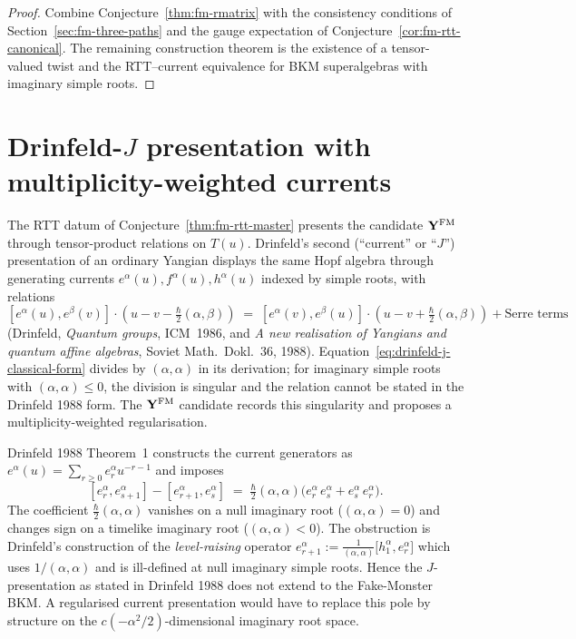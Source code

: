\begin{proof}
Combine Conjecture~\ref{thm:fm-rmatrix} with the consistency conditions
of Section~\ref{sec:fm-three-paths} and the gauge expectation of
Conjecture~\ref{cor:fm-rtt-canonical}. The remaining construction
theorem is the existence of a tensor-valued twist and the RTT--current
equivalence for BKM superalgebras with imaginary simple roots.
\end{proof}

\section{Drinfeld-\texorpdfstring{$J$}{J} presentation with multiplicity-weighted currents}
\label{sec:fm-drinfeld-j}

The RTT datum of Conjecture~\ref{thm:fm-rtt-master} presents the candidate $\mathbf{Y}^{\mathrm{FM}}$ through tensor-product relations on $T(u)$. Drinfeld's second (``current'' or ``$J$'') presentation of an ordinary Yangian displays the same Hopf algebra through generating currents $e^\alpha(u), f^\alpha(u), h^\alpha(u)$ indexed by simple roots, with relations
\begin{equation}
\label{eq:drinfeld-j-classical-form}
 [e^\alpha(u), e^\beta(v)] \cdot (u - v - \tfrac{\hbar}{2}(\alpha,\beta))
 \;=\;
 [e^\alpha(v), e^\beta(u)] \cdot (u - v + \tfrac{\hbar}{2}(\alpha,\beta)) + \text{Serre terms}
\end{equation}
(Drinfeld, \emph{Quantum groups}, ICM~1986, and \emph{A new realisation of Yangians and quantum affine algebras}, Soviet Math.~Dokl.~36, 1988). Equation~\eqref{eq:drinfeld-j-classical-form} divides by $(\alpha, \alpha)$ in its derivation; for imaginary simple roots with $(\alpha, \alpha) \leq 0$, the division is singular and the relation cannot be stated in the Drinfeld 1988 form. The $\mathbf{Y}^{\mathrm{FM}}$ candidate records this singularity and proposes a multiplicity-weighted regularisation.

\begin{remark}
\label{rem:fm-drinfeld-obstruction}
Drinfeld 1988 Theorem~1 constructs the current generators as
$e^\alpha(u) = \sum_{r\geq 0} e^\alpha_r u^{-r-1}$ and imposes
\[
 [e^\alpha_r, e^\alpha_{s+1}] - [e^\alpha_{r+1}, e^\alpha_s] \;=\; \tfrac{\hbar}{2}(\alpha, \alpha)\bigl(e^\alpha_r\, e^\alpha_s + e^\alpha_s\, e^\alpha_r\bigr).
\]
The coefficient $\tfrac{\hbar}{2}(\alpha, \alpha)$ vanishes on a null imaginary root ($(\alpha, \alpha) = 0$) and changes sign on a timelike imaginary root ($(\alpha, \alpha) < 0$). The obstruction is Drinfeld's construction of the \emph{level-raising} operator
$ e^\alpha_{r+1} := \frac{1}{(\alpha, \alpha)}\bigl[ h^\alpha_1, e^\alpha_r \bigr]$
which uses $1/(\alpha, \alpha)$ and is ill-defined at null imaginary
simple roots. Hence the $J$-presentation as stated in Drinfeld 1988
does not extend to the Fake-Monster BKM. A regularised current
presentation would have to replace this pole by structure on the
$c(-\alpha^2/2)$-dimensional imaginary root space.
\end{remark}

